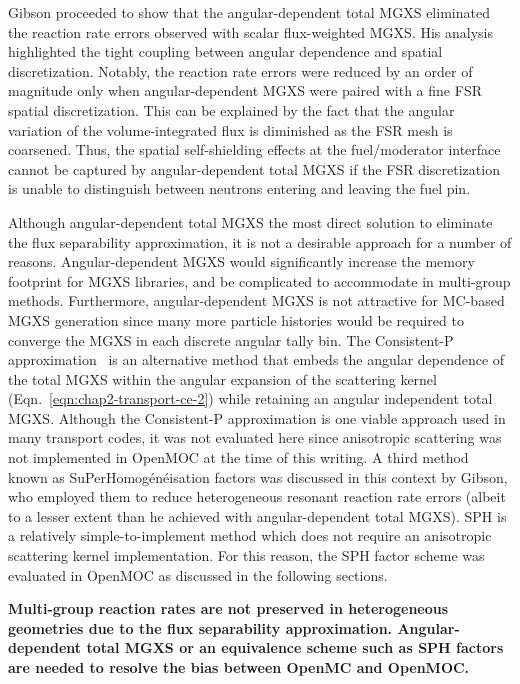 Gibson proceeded to show that the angular-dependent total \ac{MGXS} eliminated the reaction rate errors observed with scalar flux-weighted \ac{MGXS}. His analysis highlighted the tight coupling between angular dependence and spatial discretization. Notably, the reaction rate errors were reduced by an order of magnitude only when angular-dependent \ac{MGXS} were paired with a fine \ac{FSR} spatial discretization. This can be explained by the fact that the angular variation of the volume-integrated flux is diminished as the \ac{FSR} mesh is coarsened. Thus, the spatial self-shielding effects at the fuel/moderator interface cannot be captured by angular-dependent total \ac{MGXS} if the \ac{FSR} discretization is unable to distinguish between neutrons entering and leaving the fuel pin.

Although angular-dependent total \ac{MGXS} the most direct solution to eliminate the flux separability approximation, it is not a desirable approach for a number of reasons. Angular-dependent \ac{MGXS} would significantly increase the memory footprint for \ac{MGXS} libraries, and be complicated to accommodate in multi-group methods. Furthermore, angular-dependent \ac{MGXS} is not attractive for \ac{MC}-based \ac{MGXS} generation since many more particle histories would be required to converge the \ac{MGXS} in each discrete angular tally bin. The Consistent-P approximation~\cite{bell1967transport} is an alternative method that embeds the angular dependence of the total \ac{MGXS} within the angular expansion of the scattering kernel (Eqn.~\ref{eqn:chap2-transport-ce-2}) while retaining an angular independent total \ac{MGXS}. Although the Consistent-P approximation is one viable approach used in many transport codes, it was not evaluated here since anisotropic scattering was not implemented in OpenMOC at the time of this writing. A third method known as SuPerHomog\'{e}n\'{e}isation factors was discussed in this context by Gibson, who employed them to reduce heterogeneous resonant reaction rate errors (albeit to a lesser extent than he achieved with angular-dependent total \ac{MGXS}). \ac{SPH} is a relatively simple-to-implement method which does not require an anisotropic scattering kernel implementation. For this reason, the \ac{SPH} factor scheme was evaluated in OpenMOC as discussed in the following sections.


\begin{emphbox}
\textbf{Multi-group reaction rates are not preserved in heterogeneous geometries due to the flux separability approximation. Angular-dependent total \ac{MGXS} or an equivalence scheme such as \ac{SPH} factors are needed to resolve the bias between OpenMC and OpenMOC.}
\end{emphbox}

